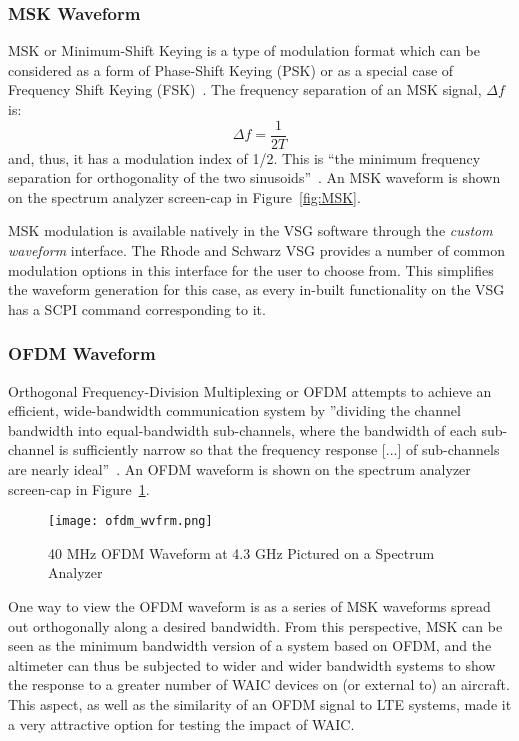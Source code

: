 \subsubsection{MSK Waveform}\label{subsub:MSK}
MSK or Minimum-Shift Keying is a type of modulation format which can be considered as a form of Phase-Shift Keying (PSK) or as a special case of Frequency Shift Keying (FSK)~\cite{proakis_communication_2002}. The frequency separation of an MSK signal, $\Delta f$ is:
$$ \Delta f = \frac{1}{2T}$$
and, thus, it has a modulation index of 1/2. This is ``the minimum frequency separation for orthogonality of the two sinusoids''~\cite{proakis_communication_2002}. An MSK waveform is shown on the spectrum analyzer screen-cap in Figure~\ref{fig:MSK}.

MSK modulation is available natively in the VSG software through the \textit{custom waveform} interface.  The Rhode and Schwarz VSG provides a number of common modulation options in this interface for the user to choose from. This simplifies the waveform generation for this case, as every in-built functionality on the VSG has a SCPI command corresponding to it. 


\subsubsection{OFDM Waveform}\label{subsub:OFDM}

Orthogonal Frequency-Division Multiplexing or OFDM attempts to achieve an efficient, wide-bandwidth communication system by ''dividing the channel bandwidth into equal-bandwidth sub-channels, where the bandwidth of each sub-channel is sufficiently narrow so that the frequency response [...] of sub-channels are nearly ideal''~\cite{proakis_communication_2002}. An OFDM waveform is shown on the spectrum analyzer screen-cap in Figure~\ref{fig:OFDM}.
\begin{figure}[ht]
\centering
\texttt{[image: ofdm\_wvfrm.png]}
\caption{40 MHz OFDM Waveform at 4.3 GHz Pictured on a Spectrum Analyzer}

\label{fig:OFDM}

\end{figure}
One way to view the OFDM waveform is as a series of MSK waveforms spread out orthogonally along a desired bandwidth. From this perspective, MSK can be seen as the minimum bandwidth version of a system based on OFDM, and the altimeter can thus be subjected to wider and wider bandwidth systems to show the response to a greater number of WAIC devices on (or external to) an aircraft. This aspect, as well as the similarity of an OFDM signal to LTE systems, made it a very attractive option for testing the impact of WAIC. 

